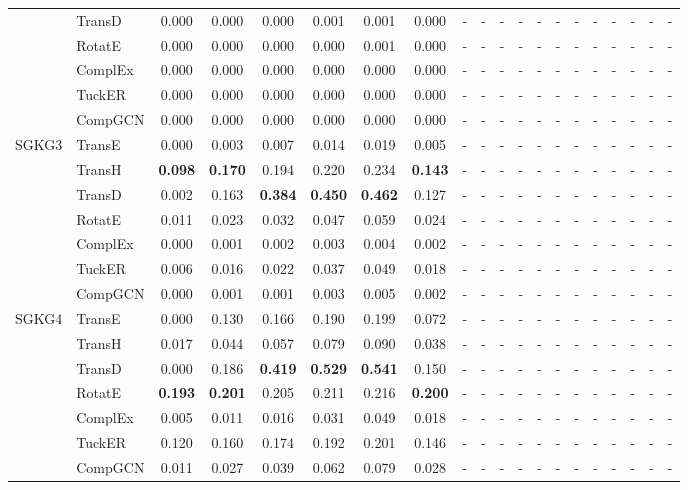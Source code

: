 \begin{table}[p]
{\begin{tabular}{l|l||cccccc||cccccc||cccccc}
 & TransD & 0.000 & 0.000 & 0.000 & 0.001 & 0.001 & 0.000 & - & - & - & - & - & - & - & - & - & - & - & - \\
 & RotatE & 0.000 & 0.000 & 0.000 & 0.000 & 0.001 & 0.000 & - & - & - & - & - & - & - & - & - & - & - & - \\
 & ComplEx & 0.000 & 0.000 & 0.000 & 0.000 & 0.000 & 0.000 & - & - & - & - & - & - & - & - & - & - & - & - \\
 & TuckER & 0.000 & 0.000 & 0.000 & 0.000 & 0.000 & 0.000 & - & - & - & - & - & - & - & - & - & - & - & - \\
 & CompGCN & 0.000 & 0.000 & 0.000 & 0.000 & 0.000 & 0.000 & - & - & - & - & - & - & - & - & - & - & - & - \\
\hline
\multirow{7}{*}{SGKG3} & TransE & 0.000 & 0.003 & 0.007 & 0.014 & 0.019 & 0.005 & - & - & - & - & - & - & - & - & - & - & - & - \\
 & TransH & \textbf{0.098} & \textbf{0.170} & 0.194 & 0.220 & 0.234 & \textbf{0.143} & - & - & - & - & - & - & - & - & - & - & - & - \\
 & TransD & 0.002 & 0.163 & \textbf{0.384} & \textbf{0.450} & \textbf{0.462} & 0.127 & - & - & - & - & - & - & - & - & - & - & - & - \\
 & RotatE & 0.011 & 0.023 & 0.032 & 0.047 & 0.059 & 0.024 & - & - & - & - & - & - & - & - & - & - & - & - \\
 & ComplEx & 0.000 & 0.001 & 0.002 & 0.003 & 0.004 & 0.002 & - & - & - & - & - & - & - & - & - & - & - & - \\
 & TuckER & 0.006 & 0.016 & 0.022 & 0.037 & 0.049 & 0.018 & - & - & - & - & - & - & - & - & - & - & - & - \\
 & CompGCN & 0.000 & 0.001 & 0.001 & 0.003 & 0.005 & 0.002 & - & - & - & - & - & - & - & - & - & - & - & - \\
\hline
\multirow{7}{*}{SGKG4} & TransE & 0.000 & 0.130 & 0.166 & 0.190 & 0.199 & 0.072 & - & - & - & - & - & - & - & - & - & - & - & - \\
 & TransH & 0.017 & 0.044 & 0.057 & 0.079 & 0.090 & 0.038 & - & - & - & - & - & - & - & - & - & - & - & - \\
 & TransD & 0.000 & 0.186 & \textbf{0.419} & \textbf{0.529} & \textbf{0.541} & 0.150 & - & - & - & - & - & - & - & - & - & - & - & - \\
 & RotatE & \textbf{0.193} & \textbf{0.201} & 0.205 & 0.211 & 0.216 & \textbf{0.200} & - & - & - & - & - & - & - & - & - & - & - & - \\
 & ComplEx & 0.005 & 0.011 & 0.016 & 0.031 & 0.049 & 0.018 & - & - & - & - & - & - & - & - & - & - & - & - \\
 & TuckER & 0.120 & 0.160 & 0.174 & 0.192 & 0.201 & 0.146 & - & - & - & - & - & - & - & - & - & - & - & - \\
 & CompGCN & 0.011 & 0.027 & 0.039 & 0.062 & 0.079 & 0.028 & - & - & - & - & - & - & - & - & - & - & - & - \\
\hline
\end{tabular}%
}
\end{table}
